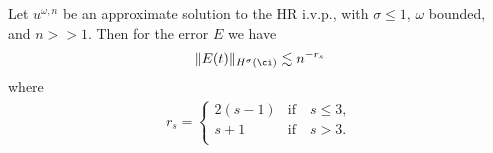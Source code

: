 	  \begin{lemma}
		  \label{lem:error_of_approx_solution}
		  Let $u^{\omega,n}$ be an approximate solution to the HR i.v.p., 
		  with $\sigma \le 1$,  $\omega$ bounded, and $n >> 1$.
		  Then for the error $E$ we have
		  \begin{equation}
			  \begin{split}
				  \|E(t)\|_{H^\sigma(\ci)} \lesssim n^{-r_s}
				  \label{total-error-approx-solution}
			  \end{split}
		  \end{equation}
		  where
		  \begin{equation}
			  \begin{split}
			r_s = 
			\begin{cases}
				2(s-1)   & \text{if} \quad s \le 3,\\  
				s+1  & \text{if} \quad s > 3. \\
			\end{cases}
			\label{r_s-definition}
			  \end{split}
		  \end{equation}
	  \end{lemma}
